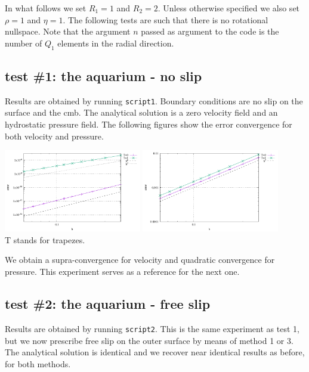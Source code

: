 In what follows we set $R_1=1$ and $R_2=2$. Unless otherwise specified we also set $\rho=1$
and $\eta=1$. The following tests are such that there is no rotational nullspace.
Note that the argument $n$ passed as argument to the code is the number of $Q_1$ 
elements in the radial direction.

\subsection*{test \#1: the aquarium - no slip}

Results are obtained by running {\tt script1}. Boundary conditions are 
no slip on the surface and the cmb. 
The analytical solution is a zero velocity field and an hydrostatic pressure field.
The following figures show the error convergence for both velocity and pressure.

\begin{center}
\includegraphics[width=6cm]{python_codes/fieldstone_151/results/test1/errv}
\includegraphics[width=6cm]{python_codes/fieldstone_151/results/test1/errp}\\
{\captionfont T stands for {\python trapezes}.}
\end{center}

We obtain a supra-convergence for velocity and quadratic convergence for pressure.
This experiment serves as a reference for the next one.

\subsection*{test \#2: the aquarium - free slip}

Results are obtained by running {\tt script2}. 
This is the same experiment as test 1, but we now prescribe free slip on the 
outer surface by means of method 1 or 3. The analytical solution is identical 
and we recover near identical results as before, for both methods.

